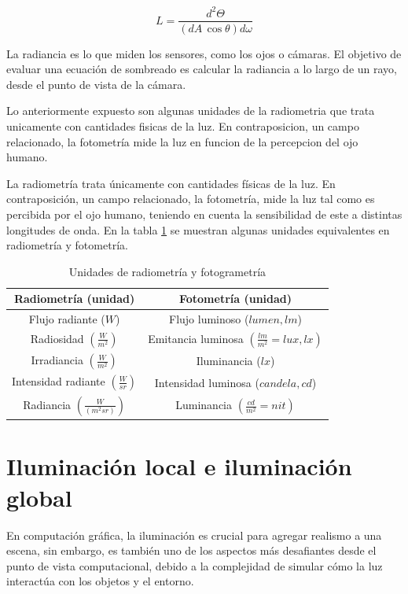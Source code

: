 $$
L = \frac{d^2\Theta}{(dA\,\cos\theta)d\omega}
$$

La radiancia es lo que miden los sensores, como los ojos o cámaras.
El objetivo de evaluar una ecuación de sombreado es calcular la radiancia a lo largo de un rayo, desde el punto de vista de la cámara.

Lo anteriormente expuesto son algunas unidades de la radiometria que trata unicamente con cantidades fisicas de la luz.
En contraposicion, un campo relacionado, la fotometría mide la luz en funcion de la percepcion del ojo humano.

La radiometría trata únicamente con cantidades físicas de la luz.
En contraposición, un campo relacionado, la fotometría, mide la luz tal como es percibida por el ojo humano, teniendo en cuenta la sensibilidad de este a distintas longitudes de onda.
En la tabla \ref{table:light_units} se muestran algunas unidades equivalentes en radiometría y fotometría.

\begin{table}
\centering
\begin{tabular}{|c|c|}
    \hline
    \textbf{Radiometría (unidad)} & \textbf{Fotometría (unidad)} \\
    \hline
    Flujo radiante ($W$) & Flujo luminoso ($lumen, lm$) \\
    Radiosidad $\left(\frac{W}{m^2}\right)$ & Emitancia luminosa $\left(\frac{lm}{m^2} = lux, lx\right)$ \\
    Irradiancia $\left(\frac{W}{m^2}\right)$ & Iluminancia ($lx$) \\
    Intensidad radiante $\left(\frac{W}{sr}\right)$ & Intensidad luminosa ($candela, cd$) \\
    Radiancia $\left(\frac{W}{(m^2sr)}\right)$ & Luminancia $\left(\frac{cd}{m^2} = nit\right)$ \\
    \hline
\end{tabular}
\caption{Unidades de radiometría y fotogrametría}
\label{table:light_units}
\end{table}

\section{Iluminación local e iluminación global}\label{sec:local_vs_global}

En computación gráfica, la iluminación es crucial para agregar realismo a una escena, sin embargo, es también uno de los aspectos más desafiantes desde el punto de vista computacional, debido a la complejidad de simular cómo la luz interactúa con los objetos y el entorno.

